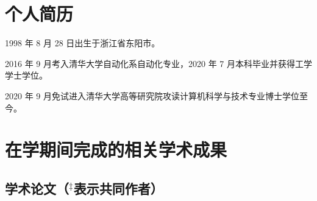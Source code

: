 
\begin{resume}

  \section*{个人简历}

  1998 年 8 月 28 日出生于浙江省东阳市。

  2016 年 9 月考入清华大学自动化系自动化专业，2020 年 7 月本科毕业并获得工学学士学位。

  2020 年 9 月免试进入清华大学高等研究院攻读计算机科学与技术专业博士学位至今。


  \section*{在学期间完成的相关学术成果}

  \subsection*{学术论文（$^\ddag$表示共同作者）}


\end{resume}
